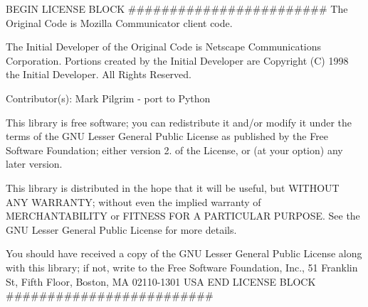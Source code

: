 B\+E\+G\+IN L\+I\+C\+E\+N\+SE B\+L\+O\+CK \#\#\#\#\#\#\#\#\#\#\#\#\#\#\#\#\#\#\#\#\#\#\#\# The Original Code is Mozilla Communicator client code. 

The Initial Developer of the Original Code is Netscape Communications Corporation. Portions created by the Initial Developer are Copyright (C) 1998 the Initial Developer. All Rights Reserved.

Contributor(s)\+: Mark Pilgrim -\/ port to Python

This library is free software; you can redistribute it and/or modify it under the terms of the G\+NU Lesser General Public License as published by the Free Software Foundation; either version 2. of the License, or (at your option) any later version.

This library is distributed in the hope that it will be useful, but W\+I\+T\+H\+O\+UT A\+NY W\+A\+R\+R\+A\+N\+TY; without even the implied warranty of M\+E\+R\+C\+H\+A\+N\+T\+A\+B\+I\+L\+I\+TY or F\+I\+T\+N\+E\+SS F\+OR A P\+A\+R\+T\+I\+C\+U\+L\+AR P\+U\+R\+P\+O\+SE. See the G\+NU Lesser General Public License for more details.

You should have received a copy of the G\+NU Lesser General Public License along with this library; if not, write to the Free Software Foundation, Inc., 51 Franklin St, Fifth Floor, Boston, MA 02110-\/1301 U\+SA E\+ND L\+I\+C\+E\+N\+SE B\+L\+O\+CK \#\#\#\#\#\#\#\#\#\#\#\#\#\#\#\#\#\#\#\#\#\#\#\#\# 